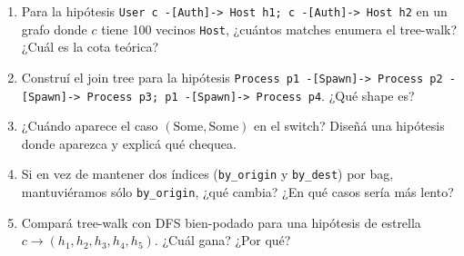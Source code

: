 \begin{ejercicios}
\begin{enumerate}
    \item \starred{} Para la hipótesis
    \texttt{User c -[Auth]-> Host h1; c -[Auth]-> Host h2}
    en un grafo donde \(c\) tiene 100 vecinos \texttt{Host}, ¿cuántos
    matches enumera el tree-walk? ¿Cuál es la cota teórica?

    \item Construí el join tree para la hipótesis
    \texttt{Process p1 -[Spawn]-> Process p2 -[Spawn]-> Process p3; p1 -[Spawn]-> Process p4}.
    ¿Qué shape es?

    \item \starred{} ¿Cuándo aparece el caso
    \((\mathrm{Some}, \mathrm{Some})\) en el switch? Diseñá una
    hipótesis donde aparezca y explicá qué chequea.

    \item Si en vez de mantener dos índices (\texttt{by\_origin} y
    \texttt{by\_dest}) por bag, mantuviéramos sólo
    \texttt{by\_origin}, ¿qué cambia? ¿En qué casos sería más
    lento?

    \item Compará tree-walk con DFS bien-podado para una hipótesis
    de estrella \(c \to (h_1, h_2, h_3, h_4, h_5)\). ¿Cuál gana?
    ¿Por qué?
\end{enumerate}
\end{ejercicios}
